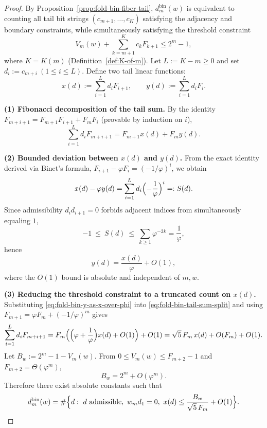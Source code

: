 \begin{proof}
By Proposition~\ref{prop:fold-bin-fiber-tail},
\(
d^{\mathrm{bin}}_m(w)
\)
is equivalent to counting all tail bit strings \((c_{m+1},\dots,c_K)\) satisfying the adjacency and boundary constraints, while simultaneously satisfying the threshold constraint
\[
V_m(w)+\sum_{k=m+1}^{K}c_k F_{k+1}\le 2^m-1,
\]
where \(K=K(m)\) (Definition~\ref{def:K-of-m}).
Let \(L:=K-m\ge 0\) and set
\(
d_i:=c_{m+i}\ (1\le i\le L)
\).
Define two tail linear functions:
\[
x(d):=\sum_{i=1}^{L} d_i F_{i+1},
\qquad
y(d):=\sum_{i=1}^{L} d_i F_i.
\]
\par
\noindent\textbf{(1) Fibonacci decomposition of the tail sum.}
By the identity
\(
F_{m+i+1}=F_{m+1}F_{i+1}+F_m F_i
\)
(provable by induction on \(i\)),
\begin{equation}\label{eq:fold-bin-tail-sum-split}
\sum_{i=1}^{L} d_i F_{m+i+1}=F_{m+1}x(d)+F_m y(d).
\end{equation}
\par
\noindent\textbf{(2) Bounded deviation between \(x(d)\) and \(y(d)\).}
From the exact identity derived via Binet's formula,
\(
F_{i+1}-\varphi F_i=(-1/\varphi)^i
\),
we obtain
\[
x(d)-\varphi y(d)=\sum_{i=1}^{L} d_i\Bigl(-\frac{1}{\varphi}\Bigr)^i=:S(d).
\]
Since admissibility \(d_id_{i+1}=0\) forbids adjacent indices from simultaneously equaling \(1\),
\[
-1\ \le\ S(d)\ \le\ \sum_{k\ge 1}\varphi^{-2k}=\frac{1}{\varphi},
\]
hence
\begin{equation}\label{eq:fold-bin-y-as-x-over-phi}
y(d)=\frac{x(d)}{\varphi}+O(1),
\end{equation}
where the \(O(1)\) bound is absolute and independent of \(m,w\).
\par
\noindent\textbf{(3) Reducing the threshold constraint to a truncated count on \(x(d)\).}
Substituting \eqref{eq:fold-bin-y-as-x-over-phi} into \eqref{eq:fold-bin-tail-sum-split} and using
\(
F_{m+1}=\varphi F_m+(-1/\varphi)^m
\)
gives
\[
\sum_{i=1}^{L} d_i F_{m+i+1}
=F_m\Bigl(\Bigl(\varphi+\frac{1}{\varphi}\Bigr)x(d)+O(1)\Bigr)+O(1)
=\sqrt5\,F_m\,x(d)+O(F_m)+O(1).
\]
Let \(B_w:=2^m-1-V_m(w)\).
From \(0\le V_m(w)\le F_{m+2}-1\) and \(F_{m+2}=\Theta(\varphi^m)\),
\begin{equation}\label{eq:fold-bin-Bw-as-2m}
B_w=2^m+O(\varphi^m).
\end{equation}
Therefore there exist absolute constants such that
\begin{equation}\label{eq:fold-bin-d-count-x-threshold}
d^{\mathrm{bin}}_m(w)
=\#\Bigl\{d:\ d\ \text{admissible},\ w_m d_1=0,\ x(d)\le \frac{B_w}{\sqrt5\,F_m}+O(1)\Bigr\}.

\end{equation}
\end{proof}
